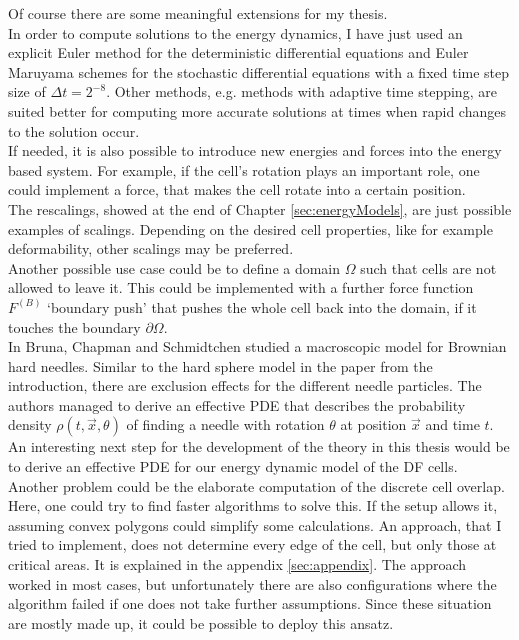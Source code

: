 \documentclass[a4paper,12pt,leqno]{article}
\theoremstyle{plain}
\theoremstyle{remark}
\begin{document}
Of course there are some meaningful extensions for my thesis. \\
In order to compute solutions to the energy dynamics, I have just used an explicit Euler method for the deterministic differential equations and Euler Maruyama schemes for the stochastic differential equations with a fixed time step size of $\Delta t = 2^{-8}$. Other methods, e.g. methods with adaptive time stepping, are suited better for computing more accurate solutions at times when rapid changes to the solution occur. \\
If needed, it is also possible to introduce new energies and forces into the energy based system. For example, if the cell's rotation plays an important role, one could implement a force, that makes the cell rotate into a certain position. \\
The rescalings, showed at the end of Chapter \ref{sec:energyModels}, are just possible examples of scalings. Depending on the desired cell properties, like for example deformability, other scalings may be preferred. \\
Another possible use case could be to define a domain $\Omega$ such that cells are not allowed to leave it. This could be implemented with a further force function $F^{(B)}$ `boundary push' that pushes the whole cell back into the domain, if it touches the boundary $\partial \Omega$. \\
In \cite{Bruna2023} Bruna, Chapman and Schmidtchen studied a macroscopic model for Brownian hard needles. Similar to the hard sphere model in the paper \cite{Bruna2012} from the introduction, there are exclusion effects for the different needle particles. The authors managed to derive an effective PDE that describes the probability density $\rho(t,\vec{x}, \theta)$ of finding a needle with rotation $\theta$ at position $\vec{x}$ and time $t$. An interesting next step for the development of the theory in this thesis would be to derive an effective PDE for our energy dynamic model of the DF cells. \\
Another problem could be the elaborate computation of the discrete cell overlap. Here, one could try to find faster algorithms to solve this. If the setup allows it, assuming convex polygons could simplify some calculations. An approach, that I tried to implement, does not determine every edge of the cell, but only those at critical areas. It is explained in the appendix \ref{sec:appendix}. The approach worked in most cases, but unfortunately there are also configurations where the algorithm failed if one does not take further assumptions. Since these situation are mostly made up, it could be possible to deploy this ansatz. 
\end{document}
